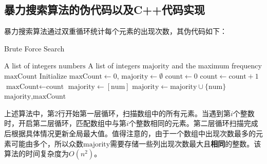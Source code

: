 \documentclass[UTF8,12pt,a4paper]{ctexart}
\begin{document}
\subsection{暴力搜索算法的伪代码以及C++代码实现}
暴力搜索算法通过双重循环统计每个元素的出现次数，其伪代码如下：
\begin{algorithm}[H]
\caption{Brute Force Search}
\begin{algorithmic}[1]
\Require A list of integers $\text{numbers}$
\Ensure A list of integers $\text{majority}$ and the maximum frequency $\text{maxCount}$
\State Initialize $\text{maxCount} \gets 0$, $\text{majority} \gets \emptyset$
    \State $\text{count} \gets 0$
            \State $\text{count} \gets \text{count} + 1$
        \EndIf
    \EndFor
        \State $\text{maxCount} \gets \text{count}$
        \State $\text{majority} \gets [\text{num}]$
        \State $\text{majority} \gets \text{majority} \cup \{\text{num}\}$
    \EndIf
\EndFor
\State \Return $\text{majority}, \text{maxCount}$
\end{algorithmic}
\end{algorithm}

上述算法中，第2行开始第一层循环，扫描数组中的所有元素。当遇到第$i$个整数时，开启第二层循环，匹配数组中与第$i$个整数相同的元素。第二层循环扫描完成后根据具体情况更新全局最大值。值得注意的，由于一个数组中出现次数最多的元素可能由多个，所以众数$\text{majority}$需要存储一些列出现次数最大且\textbf{相同}的整数。该算法的时间复杂度为$O(n^2)$。
\end{document}
